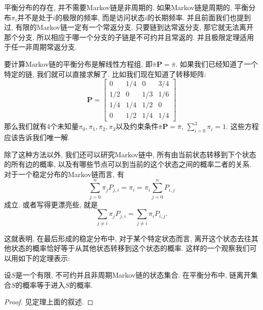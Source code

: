 \begin{remark}
    平衡分布的存在, 并不需要Markov链是非周期的. 如果Markov链是周期的, 平衡分布$\pi_i$并不是处于$i$的极限的频率, 而是访问状态$i$的长期频率. 并且前面我们也提到过, 有限的Markov链一定有一个常返分支. 只要链到达常返分支, 那它就无法离开那个分支. 所以相应于哪一个分支的子链是不可约并且常返的. 并且极限定理适用于任一非周期常返分支. 
\end{remark}

要计算Markov链的平衡分布是解线性方程组, 即$\bar{\pi} \mathbf{P}=\bar{\pi}$. 如果我们已经知道了一个特定的链, 我们就可以直接求解了. 比如我们现在知道了转移矩阵: 
$$
\mathbf{P}=\left[\begin{array}{cccc}
0 & 1 / 4 & 0 & 3 / 4 \\
1 / 2 & 0 & 1 / 3 & 1 / 6 \\
1 / 4 & 1 / 4 & 1 / 2 & 0 \\
0 & 1 / 2 & 1 / 4 & 1 / 4
\end{array}\right]
$$
那么我们就有4个未知量$\pi_0, \pi_1, \pi_2, \pi_3$以及约束条件$\bar{\pi} \mathbf{P}=\bar{\pi}$, $\sum_{i=0}^3 \pi_i=1$. 这些方程应该告诉我们唯一解. 

除了这种方法以外, 我们还可以研究Markov链中, 所有由当前状态转移到下个状态的所有边的概率, 以及有哪些节点可以到当前的这个状态之间的概率二者的关系.  对于一个稳定分布的Markov链而言, 有$$\sum_{j=0}^n \pi_j P_{j, i}=\pi_i=\pi_i \sum_{j=0}^n P_{i, j}$$成立. 或者写得更漂亮些, 就是$$\sum_{j \neq i} \pi_j P_{j, i}=\sum_{j \neq i} \pi_i P_{i, j}.$$

这就表明, 在最后形成的稳定分布中, 对于某个特定状态而言, 离开这个状态去往其他状态的概率恰好等于从其他状态转移到这个状态的概率. 这样的一个观察我们可以用如下的定理表示: 
\begin{theorem}
    \label{thm:in-equal-out}
    设$S$是一个有限, 不可约并且非周期Markov链的状态集合. 在平衡分布中, 链离开集合$S$的概率等于进入$S$的概率. 
\end{theorem}

\begin{proof}
    见定理上面的叙述. 
\end{proof}

